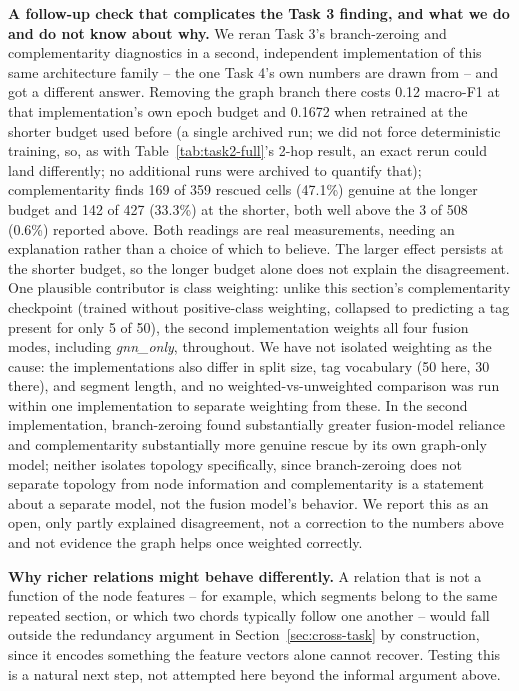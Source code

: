 \textbf{A follow-up check that complicates the Task 3 finding, and what we do and do not know
about why.} We reran Task 3's branch-zeroing and complementarity diagnostics in a second,
independent implementation of this same architecture family -- the one Task 4's own numbers
are drawn from -- and got a different answer. Removing the graph branch there costs 0.12
macro-F1 at that implementation's own epoch budget and 0.1672 when retrained at the shorter
budget used before (a single archived run; we did not force deterministic training, so, as
with Table~\ref{tab:task2-full}'s 2-hop result, an exact rerun could land differently; no
additional runs were archived to quantify that); complementarity finds 169 of 359 rescued
cells (47.1\%) genuine at the longer budget and 142 of 427 (33.3\%) at the shorter, both well
above the 3 of 508 (0.6\%) reported above. Both readings are real measurements, needing an
explanation rather than a choice of which to believe. The larger effect persists at the
shorter budget, so the longer budget alone does not explain the disagreement. One plausible
contributor is class weighting: unlike this section's complementarity checkpoint (trained
without positive-class weighting, collapsed to predicting a tag present for only 5 of 50),
the second implementation weights all four fusion modes, including \textit{gnn\_only},
throughout. We have not isolated weighting as the cause: the implementations also differ in
split size, tag vocabulary (50 here, 30 there), and segment length, and no
weighted-vs-unweighted comparison was run within one implementation to separate weighting
from these. In the second implementation, branch-zeroing found substantially greater
fusion-model reliance and complementarity substantially more genuine rescue by its own
graph-only model; neither isolates topology specifically, since branch-zeroing does not
separate topology from node information and complementarity is a statement about a separate
model, not the fusion model's behavior. We report this as an open, only partly explained
disagreement, not a correction to the numbers above and not evidence the graph helps once
weighted correctly.

\textbf{Why richer relations might behave differently.} A relation that is not a function of
the node features -- for example, which segments belong to the same repeated section, or
which two chords typically follow one another -- would fall outside the redundancy argument
in Section~\ref{sec:cross-task} by construction, since it encodes something the feature
vectors alone cannot recover. Testing this is a natural next step, not attempted here beyond
the informal argument above.
